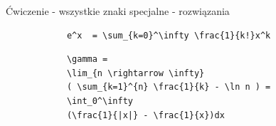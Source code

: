 \documentclass{beamer}
\theoremstyle{newblock}
\begin{document}
\begin{frame}[fragile]{Ćwiczenie  - wszystkie znaki specjalne - rozwiązania}


    \begin{examples}
        \begin{verbatim}
            e^x  = \sum_{k=0}^\infty \frac{1}{k!}x^k
        \end{verbatim}
    \end{examples}
    



    \begin{examples}
        \begin{verbatim}
            \gamma = 
            \lim_{n \rightarrow \infty} 
            ( \sum_{k=1}^{n} \frac{1}{k} - \ln n ) = 
            \int_0^\infty 
            (\frac{1}{|x|} - \frac{1}{x})dx
        \end{verbatim}
    \end{examples}
\end{frame}
\end{document}
